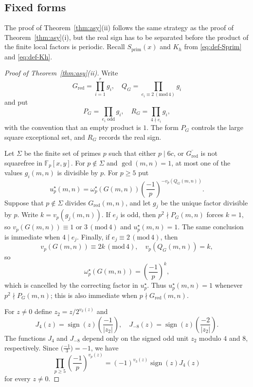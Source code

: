 \documentclass[12pt,reqno]{amsart}
\numberwithin{equation}{section}
\theoremstyle{definition}
\renewcommand{\ge}{\geqslant}
\newcommand{\FF}{\mathbb{F}}
\DeclareMathOperator{\sign}{sign}
\renewcommand{\pmod}[1]{\,(\mathrm{mod}\,#1)}
\begin{document}
\subsection{Fixed forms}

The proof of Theorem~\ref{thm:asy}(ii) follows the same strategy as the proof of Theorem~\ref{thm:asy}(i), but the real sign has to be separated before the product of the finite local factors is periodic.
Recall $S_{\mathrm{prim}}(x)$ and $K_h$ from \eqref{eq:def-Sprim} and \eqref{eq:def-Kh}.

\begin{proof}[Proof of Theorem~\ref{thm:asy}(ii)]
Write
\[
G_{\mathrm{red}}=\prod_{i=1}^r g_i,\quad
Q_G=\prod_{e_i\equiv2\pmod4}g_i
\]
and put
\[
P_G=\prod_{e_i\text{ odd}}g_i,
\quad
R_G=\prod_{4\nmid e_i}g_i,
\]
with the convention that an empty product is $1$.
The form $P_G$ controls the large square exceptional set, and $R_G$ records the real sign.

Let $\Sigma$ be the finite set of primes $p$ such that either $p\mid 6c$, or $\overline{G_{\mathrm{red}}}$ is not squarefree in $\FF_p[x,y]$.
For $p\notin \Sigma$ and $\gcd(m,n)=1$, at most one of the values $g_i(m,n)$ is divisible by $p$.
For $p\ge 5$ put
\[
u_p^\star(m,n)
=\omega_p^\star(G(m,n))
\left(\frac{-1}{p}\right)^{-v_p(Q_G(m,n))}.
\]
Suppose that $p\notin\Sigma$ divides $G_{\mathrm{red}}(m,n)$, and let $g_j$ be the unique factor divisible by $p$.
Write $k=v_p(g_j(m,n))$.
If $e_j$ is odd, then $p^2\nmid P_G(m,n)$ forces $k=1$, so $v_p(G(m,n))\equiv1$ or $3\pmod4$ and $u_p^\star(m,n)=1$.
The same conclusion is immediate when $4\mid e_j$.
Finally, if $e_j\equiv2\pmod4$, then
\[
v_p(G(m,n))\equiv2k\pmod4,\quad v_p(Q_G(m,n))=k,
\]
so
\[
\omega_p^\star(G(m,n))
=\left(\frac{-1}{p}\right)^k,
\]
which is cancelled by the correcting factor in $u_p^\star$.
Thus $u_p^\star(m,n)=1$ whenever $p^2\nmid P_G(m,n)$; this is also immediate when $p\nmid G_{\mathrm{red}}(m,n)$.

For $z\neq 0$ define $z_2=z/2^{v_2(z)}$ and
\[
J_4(z)=\sign(z)\left(\frac{-1}{|z_2|}\right),
\quad
J_{-8}(z)=\sign(z)\left(\frac{-2}{|z_2|}\right).
\]
The functions $J_4$ and $J_{-8}$ depend only on the signed odd unit $z_2$ modulo $4$ and $8$, respectively.
Since $\bigl(\frac{-1}{3}\bigr)=-1$, we have
\begin{equation}\label{eq:asy-chi-star}
\prod_{p\ge 5}\left(\frac{-1}{p}\right)^{v_p(z)}
=(-1)^{v_3(z)}\sign(z)J_4(z)
\end{equation}
for every $z\neq0$.


\end{proof}
\end{document}
